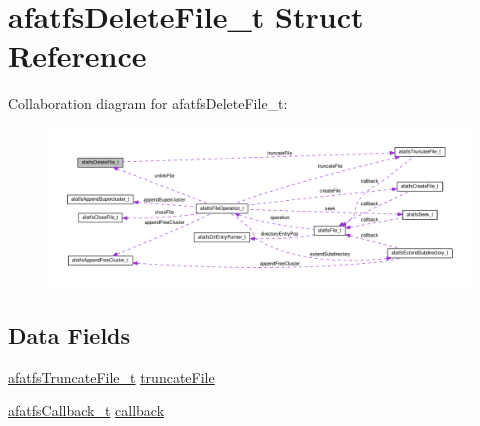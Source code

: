 \hypertarget{structafatfsDeleteFile__t}{\section{afatfs\+Delete\+File\+\_\+t Struct Reference}
\label{structafatfsDeleteFile__t}
}


Collaboration diagram for afatfs\+Delete\+File\+\_\+t\+:\nopagebreak
\begin{figure}[H]
\begin{center}
\leavevmode
\includegraphics[width=350pt]{structafatfsDeleteFile__t__coll__graph}
\end{center}
\end{figure}
\subsection*{Data Fields}
\begin{DoxyCompactItemize}
\item 
\hyperlink{structafatfsTruncateFile__t}{afatfs\+Truncate\+File\+\_\+t} \hyperlink{structafatfsDeleteFile__t_a4ac22a609fe0837febbc8333a77e48a1}{truncate\+File}
\item 
\hyperlink{asyncfatfs_8h_aa4837467d0a7947ee352ef3650a17bdf}{afatfs\+Callback\+\_\+t} \hyperlink{structafatfsDeleteFile__t_a5b5fdfdf6b2e0c1f9c108a4488efe6e0}{callback}
\end{DoxyCompactItemize}


